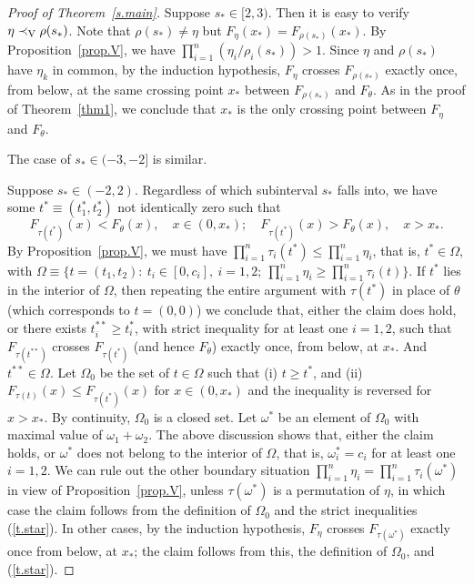 \documentclass[11pt]{article}
\begin{document}
\begin{proof}[Proof of Theorem~\ref{s.main}]
Suppose $s_*\in [2, 3)$.  Then it is easy to verify $\eta\prec_{\rm V} \rho(s_*)$.  Note that $\rho(s_*)\neq \eta$ but $F_\eta(x_*) = F_{\rho(s_*)}(x_*)$.  By  Proposition~\ref{prop.V}, we have $\prod_{i=1}^n (\eta_i/\rho_i(s_*))> 1$.  Since $\eta$ and $\rho(s_*)$ have $\eta_k$ in common, by the induction hypothesis, $F_\eta$ crosses $F_{\rho(s_*)}$ exactly once, from below, at the same crossing point $x_*$ between $F_{\rho(s_*)}$ and $F_\theta$.  As in the proof of Theorem~\ref{thm1}, we conclude that $x_*$ is the only crossing point between $F_\eta$ and $F_\theta$. 

The case of $s_*\in (-3, -2]$ is similar. 

Suppose $s_*\in (-2, 2)$.  Regardless of which subinterval $s_*$ falls into, we have some $t^*\equiv(t_1^*, t_2^*)$ not identically zero such that 
\begin{equation}
\label{t.star}
F_{\tau(t^*)}(x) < F_\theta(x),\quad x\in (0, x_*);\quad F_{\tau(t^*)}(x) > F_\theta(x), \quad x> x_*.
\end{equation}
 By Proposition~\ref{prop.V}, we must have $\prod_{i=1}^n \tau_i(t^*) \leq \prod_{i=1}^n \eta_i$, that is, $t^*\in \Omega$, with
$\Omega\equiv \{t=(t_1, t_2):\ t_i \in [0, c_i],\ i=1,2;\ \prod_{i=1}^n \eta_i \geq \prod_{i=1}^n \tau_i(t)\}.$  If $t^*$ lies in the interior of $\Omega$, then repeating the entire argument with $\tau(t^*)$ in place of $\theta$ (which corresponds to $t=(0, 0)$) we conclude that, either the claim does hold, or there exists $t_i^{**}\geq t_i^*$, with strict inequality for at least one $i=1,2$, such that $F_{\tau(t^{**})}$ crosses $F_{\tau(t^{*})}$ (and hence $F_\theta$) exactly once, from below, at $x_*$.  And $t^{**}\in \Omega$.  Let $\Omega_0$ be the set of $t\in \Omega$ such that (i) $t\geq t^*$, and (ii) $F_{\tau(t)}(x)\leq F_{\tau(t^*)}(x)$ for $x\in (0, x_*)$ and the inequality is reversed for $x> x_*$.  By continuity, $\Omega_0$ is a closed set.  Let $\omega^*$ be an element of $\Omega_0$ with maximal value of $\omega_1 + \omega_2$.  The above discussion shows that, either the claim holds, or $\omega^*$ does not belong to the interior of $\Omega$, that is, $ \omega^*_i=c_i$ for at least one $i=1,2$.  We can rule out the other boundary situation $\prod_{i=1}^n \eta_i =\prod_{i=1}^n \tau_i(\omega^*)$ in view of Proposition~\ref{prop.V}, unless $\tau(\omega^*)$ is a permutation of $\eta$, in which case the claim follows from the definition of $\Omega_0$ and the strict inequalities (\ref{t.star}).  In other cases, by the induction hypothesis, $F_\eta$ crosses $F_{\tau(\omega^*)}$ exactly once from below, at $x_*$; the claim follows from this, the definition of $\Omega_0$, and (\ref{t.star}). 
\end{proof}
\end{document}
